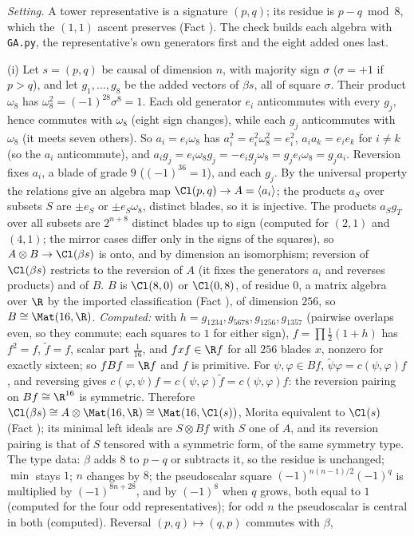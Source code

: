 \emph{Setting.} A tower representative is a signature $(p,q)$; its residue is $p - q \bmod 8$, which the $(1,1)$ ascent preserves (Fact ). The check builds each algebra with \texttt{GA.py}, the representative's own generators first and the eight added ones last.

(i) Let $s = (p,q)$ be causal of dimension $n$, with majority sign $\sigma$ ($\sigma = +1$ if $p > q$), and let $g_{1}, \dots, g_{8}$ be the added vectors of $\beta s$, all of square $\sigma$. Their product $\omega_{8}$ has $\omega_{8}^{2} = (-1)^{28}\sigma^{8} = 1$. Each old generator $e_{i}$ anticommutes with every $g_{j}$, hence commutes with $\omega_{8}$ (eight sign changes), while each $g_{j}$ anticommutes with $\omega_{8}$ (it meets seven others). So $a_{i} = e_{i}\omega_{8}$ has $a_{i}^{2} = e_{i}^{2}\omega_{8}^{2} = e_{i}^{2}$, $a_{i}a_{k} = e_{i}e_{k}$ for $i \ne k$ (so the $a_{i}$ anticommute), and $a_{i}g_{j} = e_{i}\omega_{8}g_{j} = -e_{i}g_{j}\omega_{8} = g_{j}e_{i}\omega_{8} = g_{j}a_{i}$. Reversion fixes $a_{i}$, a blade of grade $9$ ($(-1)^{36} = 1$), and each $g_{j}$. By the universal property the relations give an algebra map $\Cl(p,q) \to A = \langle a_{i}\rangle$; the products $a_{S}$ over subsets $S$ are $\pm e_{S}$ or $\pm e_{S}\omega_{8}$, distinct blades, so it is injective. The products $a_{S}g_{T}$ over all subsets are $2^{n+8}$ distinct blades up to sign (computed for $(2,1)$ and $(4,1)$; the mirror cases differ only in the signs of the squares), so $A \otimes B \to \Cl(\beta s)$ is onto, and by dimension an isomorphism; reversion of $\Cl(\beta s)$ restricts to the reversion of $A$ (it fixes the generators $a_{i}$ and reverses products) and of $B$. $B$ is $\Cl(8,0)$ or $\Cl(0,8)$, of residue $0$, a matrix algebra over $\R$ by the imported classification (Fact ), of dimension $256$, so $B \cong \Mat(16,\R)$. \emph{Computed:} with $h = g_{1234}, g_{5678}, g_{1256}, g_{1357}$ (pairwise overlaps even, so they commute; each squares to $1$ for either sign), $f = \prod\tfrac12(1 + h)$ has $f^{2} = f$, $\widetilde{f} = f$, scalar part $\tfrac1{16}$, and $fxf \in \R f$ for all $256$ blades $x$, nonzero for exactly sixteen; so $fBf = \R f$ and $f$ is primitive. For $\psi, \varphi \in Bf$, $\widetilde{\psi}\varphi = c(\psi,\varphi)f$, and reversing gives $c(\varphi,\psi)f = c(\psi,\varphi)\widetilde{f} = c(\psi,\varphi)f$: the reversion pairing on $Bf \cong \R^{16}$ is symmetric. Therefore $\Cl(\beta s) \cong A \otimes \Mat(16,\R) \cong \Mat(16, \Cl(s))$, Morita equivalent to $\Cl(s)$ (Fact ); its minimal left ideals are $S \otimes Bf$ with $S$ one of $A$, and its reversion pairing is that of $S$ tensored with a symmetric form, of the same symmetry type. The type data: $\beta$ adds $8$ to $p - q$ or subtracts it, so the residue is unchanged; $\min$ stays $1$; $n$ changes by $8$; the pseudoscalar square $(-1)^{n(n-1)/2}(-1)^{q}$ is multiplied by $(-1)^{8n + 28}$, and by $(-1)^{8}$ when $q$ grows, both equal to $1$ (computed for the four odd representatives); for odd $n$ the pseudoscalar is central in both (computed). Reversal $(p,q) \mapsto (q,p)$ commutes with $\beta$, 